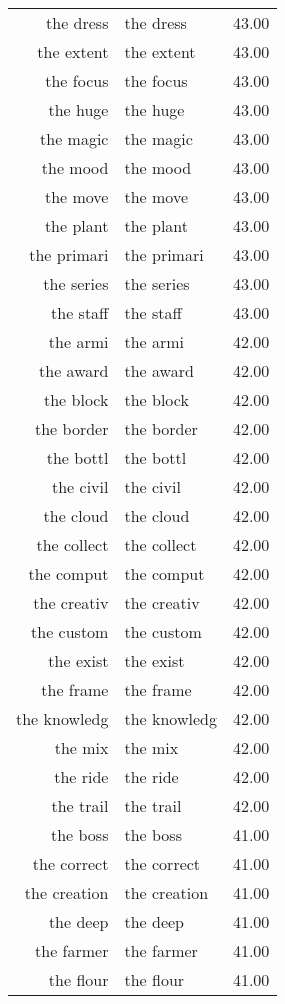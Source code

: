 \begin{table}[ht]
\begin{tabular}{rlr}
  the dress & the dress & 43.00 \\ 
  the extent & the extent & 43.00 \\ 
  the focus & the focus & 43.00 \\ 
  the huge & the huge & 43.00 \\ 
  the magic & the magic & 43.00 \\ 
  the mood & the mood & 43.00 \\ 
  the move & the move & 43.00 \\ 
  the plant & the plant & 43.00 \\ 
  the primari & the primari & 43.00 \\ 
  the series & the series & 43.00 \\ 
  the staff & the staff & 43.00 \\ 
  the armi & the armi & 42.00 \\ 
  the award & the award & 42.00 \\ 
  the block & the block & 42.00 \\ 
  the border & the border & 42.00 \\ 
  the bottl & the bottl & 42.00 \\ 
  the civil & the civil & 42.00 \\ 
  the cloud & the cloud & 42.00 \\ 
  the collect & the collect & 42.00 \\ 
  the comput & the comput & 42.00 \\ 
  the creativ & the creativ & 42.00 \\ 
  the custom & the custom & 42.00 \\ 
  the exist & the exist & 42.00 \\ 
  the frame & the frame & 42.00 \\ 
  the knowledg & the knowledg & 42.00 \\ 
  the mix & the mix & 42.00 \\ 
  the ride & the ride & 42.00 \\ 
  the trail & the trail & 42.00 \\ 
  the boss & the boss & 41.00 \\ 
  the correct & the correct & 41.00 \\ 
  the creation & the creation & 41.00 \\ 
  the deep & the deep & 41.00 \\ 
  the farmer & the farmer & 41.00 \\ 
  the flour & the flour & 41.00 \\ 

\end{tabular}
\end{table}
